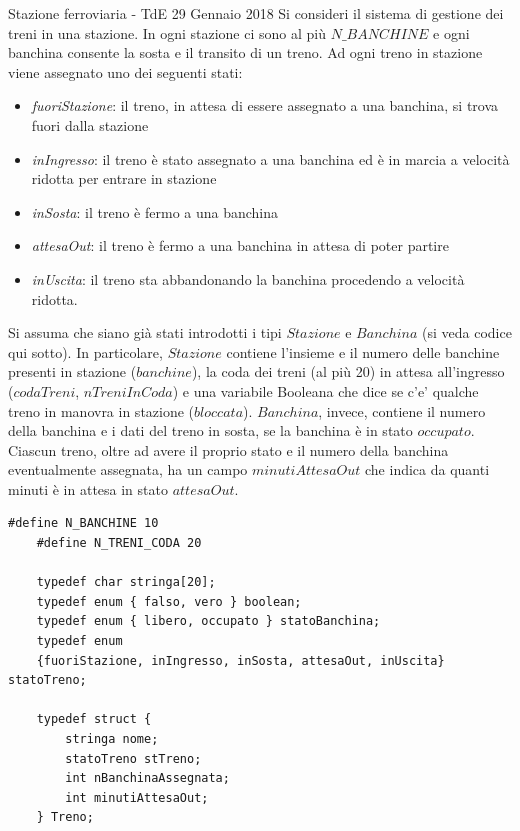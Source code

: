 \documentclass[aspectratio=169, handout]{beamer}
\begin{document}
\begin{frame}{Stazione ferroviaria - TdE 29 Gennaio 2018}
    Si consideri il sistema di gestione dei treni in una stazione.
    In ogni stazione ci sono al più $N\_BANCHINE$ e ogni banchina consente la sosta e il transito di un treno. Ad ogni treno in stazione viene assegnato uno dei seguenti stati:
    \begin{itemize}
        \item \emph{fuoriStazione}: il treno, in attesa di essere assegnato a una banchina, si trova fuori dalla stazione
        \item \emph{inIngresso}: il treno è stato assegnato a una banchina ed è in marcia a velocità ridotta per entrare in stazione
        \item \emph{inSosta}: il treno è fermo a una banchina
        \item \emph{attesaOut}: il treno è fermo a una banchina in attesa di poter partire
        \item \emph{inUscita}: il treno sta abbandonando la banchina procedendo a velocità ridotta.
    \end{itemize}

    Si assuma che siano già stati introdotti i tipi $Stazione$ e $Banchina$ (si veda codice qui sotto). In particolare, $Stazione$ contiene l'insieme e il numero delle banchine presenti in stazione ($banchine$), la coda dei treni (al più 20) in attesa all'ingresso ($codaTreni$, $nTreniInCoda$) e una variabile Booleana che dice se c'e' qualche treno in manovra in stazione ($bloccata$).
    $Banchina$, invece, contiene il numero della banchina e i dati del treno in sosta, se la banchina è in stato $occupato$. Ciascun treno, oltre ad avere il proprio stato e il numero della banchina eventualmente assegnata, ha un campo $minutiAttesaOut$ che indica da quanti minuti è in attesa in stato $attesaOut$.

    \begin{lstlisting}[style=CStyle, basicstyle=\small]
    #define N_BANCHINE 10
    #define N_TRENI_CODA 20

    typedef char stringa[20];
    typedef enum { falso, vero } boolean;
    typedef enum { libero, occupato } statoBanchina;
    typedef enum
    {fuoriStazione, inIngresso, inSosta, attesaOut, inUscita} statoTreno;

    typedef struct {
        stringa nome;
        statoTreno stTreno;
        int nBanchinaAssegnata;
        int minutiAttesaOut;
    } Treno;


\end{lstlisting}
\end{frame}
\end{document}
